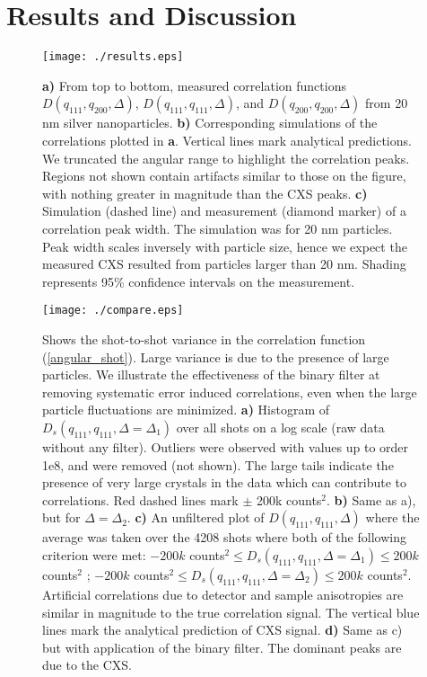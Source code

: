 \documentclass [11pt,fleqn]{article}
\begin{document}
\section{Results and Discussion}


\begin{figure}
\begin{center}
\texttt{[image: ./results.eps]}
\end{center}
\caption{ {\bf a)} From top to bottom, measured correlation functions $D (q_{111},q_{200}, \Delta  )$, $D (q_{111},q_{111}, \Delta  )$, and $D (q_{200},q_{200}, \Delta  )$ from 20 nm silver nanoparticles. {\bf b)} Corresponding simulations of the correlations plotted in {\bf a}. Vertical lines mark analytical predictions. We truncated the angular range to highlight the correlation peaks. Regions not shown contain artifacts similar to those on the figure, with nothing greater in magnitude than the CXS peaks. {\bf c)} Simulation (dashed line) and measurement (diamond marker) of a correlation peak width. The simulation was for 20 nm particles. Peak width scales inversely with particle size, hence we expect the measured CXS resulted from particles larger than 20 nm. Shading represents 95\% confidence intervals on the measurement. }
\label{fig:results}
\end{figure}

\begin{figure}
\begin{center}
\texttt{[image: ./compare.eps]}
\end{center}
\caption{ Shows the shot-to-shot variance in the correlation function (\ref{angular_shot}). Large variance is due to the presence of large particles. We illustrate the effectiveness of the binary filter at removing systematic error induced correlations, even when the large particle fluctuations are minimized. {\bf a)} Histogram of $D_s(q_{111}, q_{111}, \Delta = \Delta_1)$ over all shots on a log scale (raw data without any filter). Outliers were observed with values up to order 1e8, and were removed (not shown). The large tails indicate the presence of very large crystals in the data which can contribute to correlations. Red dashed lines mark $\pm$ 200k counts$^2$. {\bf b)} Same as a), but for $\Delta = \Delta_2$. {\bf c)} An unfiltered plot of $D(q_{111}, q_{111}, \Delta)$ where the average was taken over the 4208 shots where both of the following criterion were met: $-200k $ counts$^2 \le D_s(q_{111}, q_{111}, \Delta = \Delta_1) \le 200k$ counts$^2$ ; $-200k $ counts$^2 \le D_s(q_{111}, q_{111}, \Delta = \Delta_2) \le 200k$ counts$^2$. Artificial correlations due to detector and sample anisotropies are similar in magnitude to the true correlation signal. The vertical blue lines mark the analytical prediction of CXS signal. {\bf d)} Same as c) but with application of the binary filter. The dominant peaks are due to the CXS.}
\label{fig:compare}
\end{figure}
\end{document}
